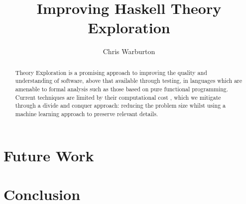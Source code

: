 \documentclass[]{article}
\begin{document}
\pagestyle{headings}  %

\title{Improving Haskell Theory Exploration}

\author{Chris Warburton}


\maketitle              %

\begin{abstract}
Theory Exploration is a promising approach to improving the quality and understanding of software, above that available through testing, in languages which are amenable to formal analysis such as those based on pure functional programming. Current techniques \iffalse TODO: it sounds as if you are talking about techniques of "formal analysis" here rather than techniques of TE. Reformulate. \fi are limited by their computational cost \iffalse TODO: Unclear what that means in this context. Computations of what is costly? why? same for "problem size" below \fi, which we mitigate through a divide and conquer approach: reducing the problem size whilst using a machine learning approach to preserve relevant details.
\end{abstract}






\iffalse
\section{First Results}

TODO

Future work?
Hypothetical use cases?
\fi



\section{Future Work}
\label{sec:future}

\iffalse
TODO

interestingness
\fi

\section{Conclusion}
\label{sec:conclusion}



\end{document}
